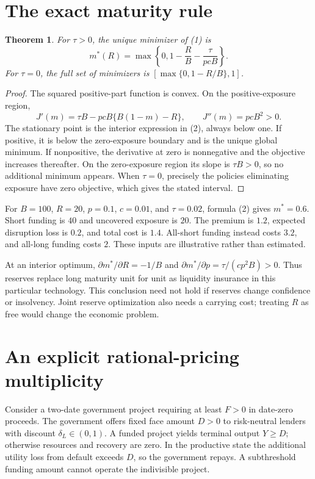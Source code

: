 \documentclass[11pt,a4paper]{article}
\newtheorem{theorem}{Theorem}[section]
\begin{document}
\section{The exact maturity rule}
\begin{theorem}
For $\tau>0$, the unique minimizer of (1) is
\[
 m^*(R)=\max\left\{0,1-\frac RB-\frac{\tau}{pcB}\right\}.
 \tag{2}
\]
For $\tau=0$, the full set of minimizers is
$[\max\{0,1-R/B\},1]$.
\end{theorem}
\begin{proof}
The squared positive-part function is convex. On the positive-exposure region,
\[
 J'(m)=\tau B-pcB\{B(1-m)-R\},\qquad J''(m)=pcB^2>0.
\]
The stationary point is the interior expression in (2), always below one. If positive, it is below the zero-exposure boundary and is the unique global minimum. If nonpositive, the derivative at zero is nonnegative and the objective increases thereafter. On the zero-exposure region its slope is $\tau B>0$, so no additional minimum appears. When $\tau=0$, precisely the policies eliminating exposure have zero objective, which gives the stated interval.
\end{proof}
For $B=100$, $R=20$, $p=0.1$, $c=0.01$, and $\tau=0.02$, formula (2) gives $m^*=0.6$. Short funding is $40$ and uncovered exposure is $20$. The premium is $1.2$, expected disruption loss is $0.2$, and total cost is $1.4$. All-short funding instead costs $3.2$, and all-long funding costs $2$. These inputs are illustrative rather than estimated.

At an interior optimum,
$\partial m^*/\partial R=-1/B$ and
$\partial m^*/\partial p=\tau/(cp^2B)>0$.
Thus reserves replace long maturity unit for unit as liquidity insurance in this particular technology. This conclusion need not hold if reserves change confidence or insolvency. Joint reserve optimization also needs a carrying cost; treating $R$ as free would change the economic problem.
\section{An explicit rational-pricing multiplicity}
Consider a two-date government project requiring at least $F>0$ in date-zero proceeds. The government offers fixed face amount $D>0$ to risk-neutral lenders with discount $\delta_L\in(0,1)$. A funded project yields terminal output $Y\ge D$; otherwise resources and recovery are zero. In the productive state the additional utility loss from default exceeds $D$, so the government repays. A subthreshold funding amount cannot operate the indivisible project.
\end{document}

